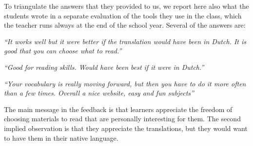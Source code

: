 To triangulate the answers that they provided to us, we report here also what the students wrote in a separate evaluation of the tools they use in the class, which the teacher runs always at the end of the school year. Several of the answers are: 

\begin{description}
  \item {\em ``It works well but it were better if the translation would have been in Dutch. It is good that you can choose what to read.''}
  \item {\em ``Good for reading skills. Would have been best if it were in Dutch.''}
  \item {\em ``Your vocabulary is really moving forward, but then you have to do it more often than a few times. Overall a nice website, easy and fun subjects''}
\end{description}

The main message in the feedback is that learners appreciate the freedom of choosing materials to read that are personally interesting for them. The second implied observation is that they appreciate the translations, but they would want to have them in their native language. 



